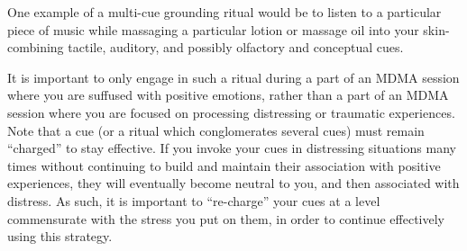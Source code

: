 \documentclass[12pt,letterpaper]{book}
\begin{document}
One example of a multi-cue grounding ritual would be to listen to a particular piece of music while massaging a particular lotion or massage oil into your skin-combining tactile, auditory, and possibly olfactory and conceptual cues.

It is important to only engage in such a ritual during a part of an MDMA session where you are suffused with positive emotions, rather than a part of an MDMA session where you are focused on processing distressing or traumatic experiences. Note that a cue (or a ritual which conglomerates several cues) must remain “charged” to stay effective. If you invoke your cues in distressing situations many times without continuing to build and maintain their association with positive experiences, they will eventually become neutral to you, and then associated with distress. As such, it is important to “re-charge” your cues at a level commensurate with the stress you put on them, in order to continue effectively using this strategy.
\end{document}
